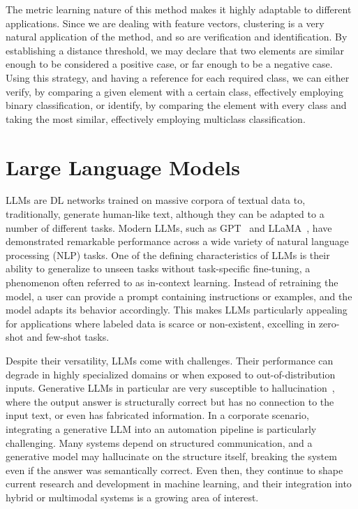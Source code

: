 The metric learning nature of this method makes it highly adaptable to different applications. Since we are dealing with feature vectors, clustering is a very natural application of the method, and so are verification and identification. By establishing a distance threshold, we may declare that two elements are similar enough to be considered a positive case, or far enough to be a negative case. Using this strategy, and having a reference for each required class, we can either verify, by comparing a given element with a certain class, effectively employing binary classification, or identify, by comparing the element with every class and taking the most similar, effectively employing multiclass classification.

\section{Large Language Models}

\glspl{LLM} are \gls{DL} networks trained on massive corpora of textual data to, traditionally, generate human-like text, although they can be adapted to a number of different tasks. Modern LLMs, such as GPT~\cite{brown_language_2020} and LLaMA~\cite{touvron_llama_2023}, have demonstrated remarkable performance across a wide variety of natural language processing (NLP) tasks. One of the defining characteristics of LLMs is their ability to generalize to unseen tasks without task-specific fine-tuning, a phenomenon often referred to as in-context learning. Instead of retraining the model, a user can provide a prompt containing instructions or examples, and the model adapts its behavior accordingly. This makes LLMs particularly appealing for applications where labeled data is scarce or non-existent, excelling in zero-shot and few-shot tasks.

Despite their versatility, LLMs come with challenges. Their performance can degrade in highly specialized domains or when exposed to out-of-distribution inputs. Generative LLMs in particular are very susceptible to hallucination~\cite{ji_survey_2023}, where the output answer is structurally correct but has no connection to the input text, or even has fabricated information. In a corporate scenario, integrating a generative LLM into an automation pipeline is particularly challenging. Many systems depend on structured communication, and a generative model may hallucinate on the structure itself, breaking the system even if the answer was semantically correct. Even then, they continue to shape current research and development in machine learning, and their integration into hybrid or multimodal systems is a growing area of interest.
